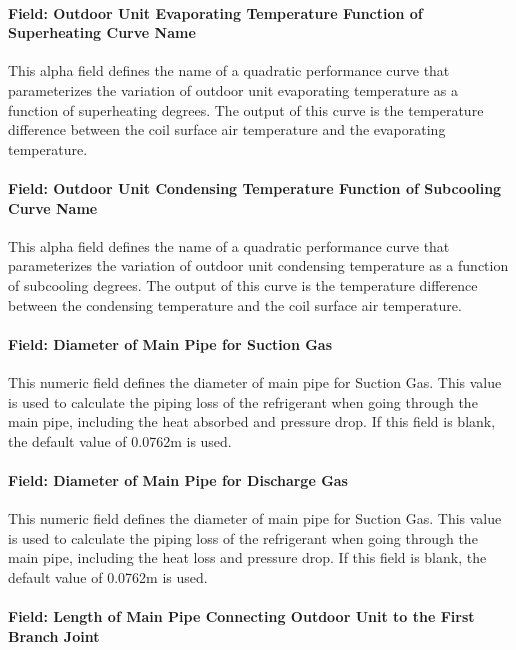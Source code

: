\paragraph{Field: Outdoor Unit Evaporating Temperature Function of Superheating Curve Name}

This alpha field defines the name of a quadratic performance curve that parameterizes the variation of outdoor unit evaporating temperature as a function of superheating degrees. The output of this curve is the temperature difference between the coil surface air temperature and the evaporating temperature.

\paragraph{Field: Outdoor Unit Condensing Temperature Function of Subcooling Curve Name}

This alpha field defines the name of a quadratic performance curve that parameterizes the variation of outdoor unit condensing temperature as a function of subcooling degrees. The output of this curve is the temperature difference between the condensing temperature and the coil surface air temperature.

\paragraph{Field: Diameter of Main Pipe for Suction Gas}

This numeric field defines the diameter of main pipe for Suction Gas. This value is used to calculate the piping loss of the refrigerant when going through the main pipe, including the heat absorbed and pressure drop. If this field is blank, the default value of 0.0762m is used.

\paragraph{Field: Diameter of Main Pipe for Discharge Gas}

This numeric field defines the diameter of main pipe for Suction Gas. This value is used to calculate the piping loss of the refrigerant when going through the main pipe, including the heat loss and pressure drop. If this field is blank, the default value of 0.0762m is used.

\paragraph{Field: Length of Main Pipe Connecting Outdoor Unit to the First Branch Joint}


